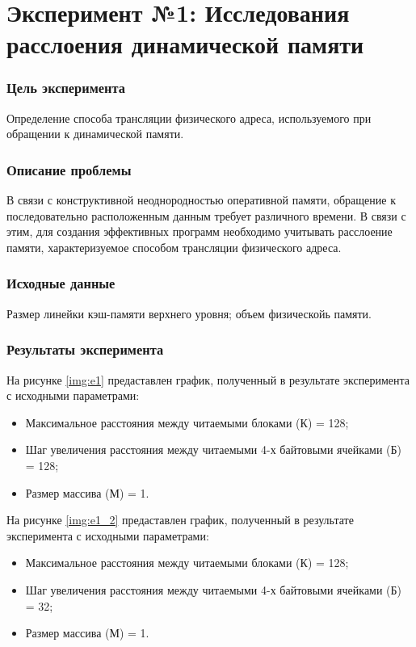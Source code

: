 \chapter*{Эксперимент №1: Исследования расслоения динамической памяти}

\subsection*{Цель эксперимента}
Определение способа трансляции физического адреса, используемого при обращении к динамической памяти. 

\subsection*{Описание проблемы}
В связи с конструктивной неоднородностью оперативной памяти, обращение к последовательно расположенным данным требует различного времени. В связи с этим, для создания эффективных программ необходимо учитывать расслоение памяти, характеризуемое способом трансляции физического адреса.

\subsection*{Исходные данные}
Размер линейки кэш-памяти верхнего уровня; объем физическойь памяти.


\subsection*{Результаты эксперимента}
На рисунке \ref{img:e1} предаставлен график, полученный в результате эксперимента с исходными параметрами:
\begin{itemize}
	\item Максимальное расстояния между	читаемыми блоками (К) = 128;
	\item Шаг увеличения расстояния между читаемыми 4-х байтовыми ячейками (Б) = 128;
	\item Размер массива (М) = 1.
\end{itemize}

\newpage

На рисунке \ref{img:e1_2} предаставлен график, полученный в результате эксперимента с исходными параметрами:
\begin{itemize}
	\item Максимальное расстояния между	читаемыми блоками (К) = 128;
	\item Шаг увеличения расстояния между читаемыми 4-х байтовыми ячейками (Б) = 32;
	\item Размер массива (М) = 1.
\end{itemize}

